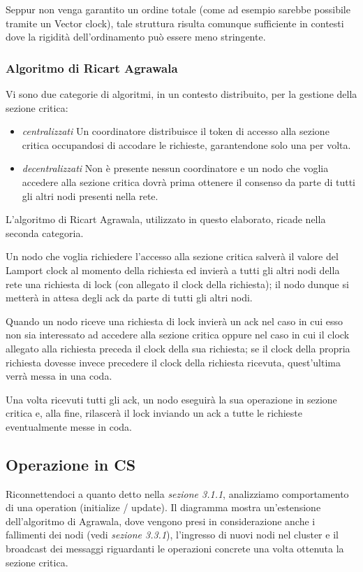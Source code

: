 \noindent Seppur non venga garantito un ordine totale (come ad esempio sarebbe possibile tramite un Vector clock), tale struttura risulta comunque sufficiente in contesti dove la rigidità dell'ordinamento può essere meno stringente.

\subsubsection{Algoritmo di Ricart Agrawala}
Vi sono due categorie di algoritmi, in un contesto distribuito, per la gestione della sezione critica:
\begin{itemize}
    \item \textit{centralizzati} \newline
    Un coordinatore distribuisce il token di accesso alla sezione critica occupandosi di accodare le richieste, garantendone solo una per volta.
    \item \textit{decentralizzati} \newline
    Non è presente nessun coordinatore e un nodo che voglia accedere alla sezione critica dovrà prima ottenere il consenso da parte di tutti gli altri nodi presenti nella rete.
\end{itemize}
L'algoritmo di Ricart Agrawala, utilizzato in questo elaborato, ricade nella seconda categoria.\newline

\noindent Un nodo che voglia richiedere l'accesso alla sezione critica salverà il valore del Lamport clock al momento della richiesta ed invierà a tutti gli altri nodi della rete una richiesta di lock (con allegato il clock della richiesta); il nodo dunque si metterà in attesa degli ack da parte di tutti gli altri nodi.\newline

\noindent Quando un nodo riceve una richiesta di lock invierà un ack nel caso in cui esso non sia interessato ad accedere alla sezione critica oppure nel caso in cui il clock allegato alla richiesta preceda il clock della sua richiesta; se il clock della propria richiesta dovesse invece precedere il clock della richiesta ricevuta, quest'ultima verrà messa in una coda.\newline

\noindent Una volta ricevuti tutti gli ack, un nodo eseguirà la sua operazione in sezione critica e, alla fine, rilascerà il lock inviando un ack a tutte le richieste eventualmente messe in coda.

\subsection{Operazione in CS}
Riconnettendoci a quanto detto nella \textit{sezione 3.1.1}, analizziamo comportamento di una operation (initialize / update).\newline
\noindent Il diagramma mostra un'estensione dell'algoritmo di Agrawala, dove vengono presi in considerazione anche i fallimenti dei nodi (vedi \textit{sezione 3.3.1}), l'ingresso di nuovi nodi nel cluster e il broadcast dei messaggi riguardanti le operazioni concrete una volta ottenuta la sezione critica.\newline

